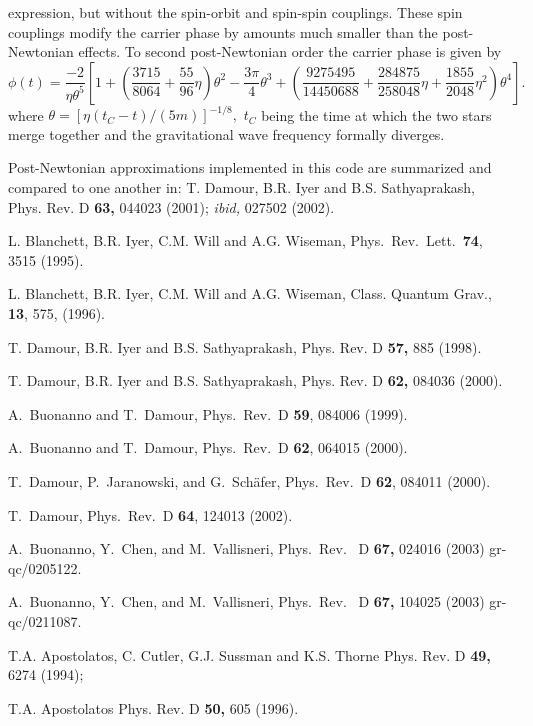 expression, but without the spin-orbit and
spin-spin couplings. These spin couplings modify the carrier phase
by amounts much smaller than the post-Newtonian effects.
To second post-Newtonian order the carrier phase is given by
\begin{equation}
\phi(t) =
\frac{-2}{\eta\theta^5}\left[1+\left(\frac{3715}{8064}+\frac
{55}{96}\eta\right)\theta^2-\frac{3\pi}{4}\theta^3
+\left(\frac{9275495}{14450688}+\frac{284875}{258048}\eta+\frac{1855}{2048}\eta^2\right)\theta^4\right].
\label{eqn:phi}
\end{equation}
where $\theta=[\eta (t_C-t)/(5m)]^{-1/8},$ $t_C$ being the time at which the two stars
merge together and the gravitational wave frequency formally diverges.


\newpage
\begin{thebibliography}{}
 Post-Newtonian approximations implemented in this code are
summarized and compared to one another in:
T. Damour, B.R. Iyer and B.S. Sathyaprakash,
Phys. Rev. D {\bf 63,} 044023 (2001); {\em ibid,} 027502 (2002).

L. Blanchett, B.R. Iyer, C.M. Will and A.G. Wiseman,
Phys.\ Rev.\ Lett.\ {\bf 74}, 3515 (1995).

L. Blanchett, B.R. Iyer, C.M. Will and A.G. Wiseman,
Class. Quantum Grav., {\bf 13}, 575, (1996).

 T. Damour, B.R. Iyer and B.S. Sathyaprakash,
Phys. Rev. D {\bf 57,} 885 (1998).

 T. Damour, B.R. Iyer and B.S. Sathyaprakash,
Phys. Rev. D {\bf 62,} 084036 (2000).

A.\ Buonanno and T.\ Damour,
Phys.\ Rev.\ D {\bf 59}, 084006 (1999).

A.\ Buonanno and T.\ Damour,
Phys.\ Rev.\ D {\bf 62}, 064015 (2000).

T.\ Damour, P.\ Jaranowski, and G.\ Sch\"afer,
Phys.\ Rev.\ D {\bf 62}, 084011 (2000).

T.\ Damour,
Phys.\ Rev.\ D {\bf 64}, 124013 (2002).

A.\ Buonanno, Y.\ Chen, and M.\ Vallisneri,
Phys.\ Rev. \ D {\bf 67,} 024016 (2003)
gr-qc/0205122.

A.\ Buonanno, Y.\ Chen, and M.\ Vallisneri,
Phys.\ Rev. \ D {\bf 67,} 104025 (2003)
gr-qc/0211087.

T.A. Apostolatos, C. Cutler, G.J. Sussman
and K.S. Thorne Phys. Rev. D {\bf 49,} 6274 (1994);

T.A. Apostolatos Phys. Rev. D {\bf 50,} 605 (1996).

\end{thebibliography}
